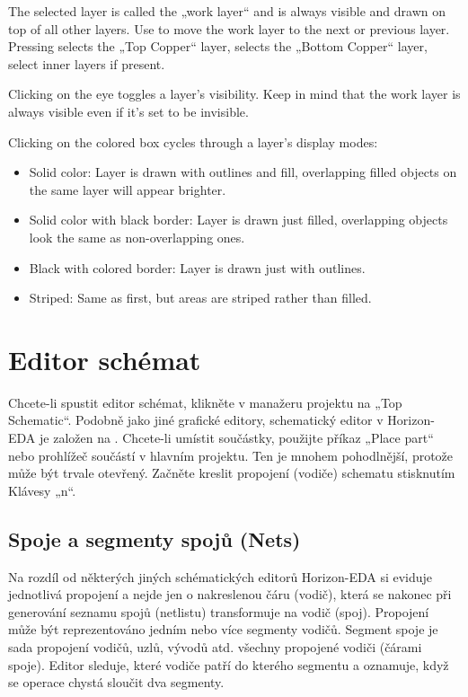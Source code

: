 \documentclass[letterpaper,10pt,czech]{sphinxmanual}
\begin{document}
\noindent{}

The selected layer is called the „work layer“ and is always visible and drawn on top of all other layers. Use  to move the work layer to the next or previous layer.
Pressing  selects the „Top Copper“ layer,  selects the „Bottom Copper“ layer,  select inner layers if present.

Clicking on the eye toggles a layer’s visibility. Keep in mind that the work layer is always visible even if it’s set to be invisible.

Clicking on the colored box cycles through a layer’s display modes:
\begin{itemize}
\item {} 
Solid color: Layer is drawn with outlines and fill, overlapping filled objects on the same layer will appear brighter.

\item {} 
Solid color with black border: Layer is drawn just filled, overlapping objects look the same as non-overlapping ones.

\item {} 
Black with colored border: Layer is drawn just with outlines.

\item {} 
Striped: Same as first, but areas are striped rather than filled.

\end{itemize}


\chapter{Editor schémat}
\label{\detokenize{imp-sch:editor-schemat}}\label{\detokenize{imp-sch::doc}}
Chcete-li spustit editor schémat, klikněte v manažeru projektu na „Top Schematic“. Podobně jako jiné grafické editory, schematický editor v Horizon-EDA je založen na . Chcete-li umístit součástky, použijte příkaz „Place part“ nebo prohlížeč součástí v hlavním projektu. Ten je mnohem pohodlnější, protože může být trvale otevřený. Začněte kreslit propojení (vodiče) schematu stisknutím Klávesy „n“.


\section{Spoje a segmenty spojů (Nets)}
\label{\detokenize{imp-sch:spoje-a-segmenty-spoju-nets}}
Na rozdíl od některých jiných schématických editorů Horizon-EDA si eviduje jednotlivá propojení a nejde jen o nakreslenou čáru (vodič), která se nakonec při generování seznamu spojů (netlistu) transformuje na vodič (spoj). Propojení může být reprezentováno jedním nebo více segmenty vodičů. Segment spoje je sada propojení vodičů, uzlů, vývodů atd. všechny propojené vodiči (čárami spoje). Editor sleduje, které vodiče patří do kterého segmentu a oznamuje, když se operace chystá sloučit dva segmenty.
\end{document}
